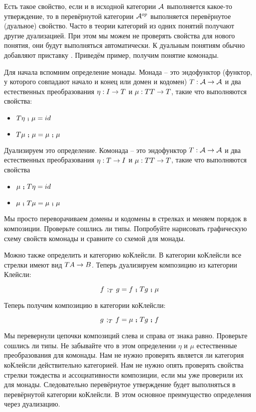 Есть такое свойство, если и в исходной категории $\mathcal{A}$
выполняется какое-то утверждение, то в перевёрнутой категории
$\mathcal{A}^{op}$ выполняется перевёрнутое (дуальное) свойство.
Часто в теории категорий из одних понятий получают другие
дуализацией. При этом мы можем не проверять свойства для
нового понятия, они будут выполняться автоматически.
К дуальным понятиям обычно добавляют приставку .
Приведём пример, получим понятие комонады.

Для начала вспомним определение монады. Монада -- это 
эндофунктор (функтор, у которого совпадают начало и конец
или домен и кодомен) $T : \mathcal{A} \rightarrow \mathcal{A}$ и два естественных
преобразования $\eta : I \rightarrow T$ и $\mu : TT \rightarrow T $,
такие что выполняются свойства:

\begin{itemize}
\item $T \eta \footnotesize\textbf{~;~}\normalsize \mu = id$
\item $T \mu \footnotesize\textbf{~;~}\normalsize \mu = \mu \footnotesize\textbf{~;~}\normalsize \mu$
\end{itemize}

Дуализируем это определение. Комонада -- это эндофунктор
$T : \mathcal{A} \rightarrow \mathcal{A}$ и два естественных преобразования
$\eta : T \rightarrow I$ и $\mu : TT \rightarrow T$, такие что  выполняются
свойства

\begin{itemize}
\item $\mu \footnotesize\textbf{~;~}\normalsize T \eta = id$
\item $\mu \footnotesize\textbf{~;~}\normalsize T \mu = \mu \footnotesize\textbf{~;~}\normalsize \mu$
\end{itemize}

Мы просто переворачиваем домены и кодомены в стрелках и
меняем порядок в композиции. Проверьте сошлись ли типы. 
Попробуйте нарисовать графическую схему свойств комонады 
и сравните со схемой для монады. 

Можно также определить и категорию коКлейсли.
В категории коКлейсли все стрелки имеют вид $TA \rightarrow B$. 
Теперь дуализируем композицию из категории Клейсли:

\[ f \textbf{~$;_{T}$~} g = f \footnotesize\textbf{~;~}\normalsize Tg \footnotesize\textbf{~;~}\normalsize \mu \]

Теперь получим композицию в категории коКлейсли:

\[ g \textbf{~$;_{T}$~} f = \mu \footnotesize\textbf{~;~}\normalsize Tg \footnotesize\textbf{~;~}\normalsize f \]

Мы перевернули цепочки композиций слева и справа от знака
равно. Проверьте сошлись ли типы. Не забывайте что в
этом определении $\eta$ и $\mu$ естественные преобразования
для комонады. Нам не нужно проверять является ли
категория коКлейсли действительно категорией. Нам
не нужно опять проверять свойства стрелки тождества и 
ассоциативности композиции, если мы уже проверили их для монады.
Следовательно перевёрнутое утверждение будет выполняться
в перевёрнутой категории коКлейсли. В этом основное 
преимущество определения через дуализацию. 

